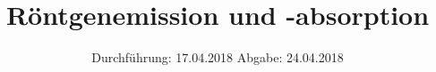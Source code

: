 

\subject{602}
\title{Röntgenemission und -absorption}
\date{%
  Durchführung: 17.04.2018
  \hspace{3em}
  Abgabe: 24.04.2018
}



\maketitle
\thispagestyle{empty}
\tableofcontents
\newpage
\setlength{\parindent}{0em}





% 



\printbibliography{}


